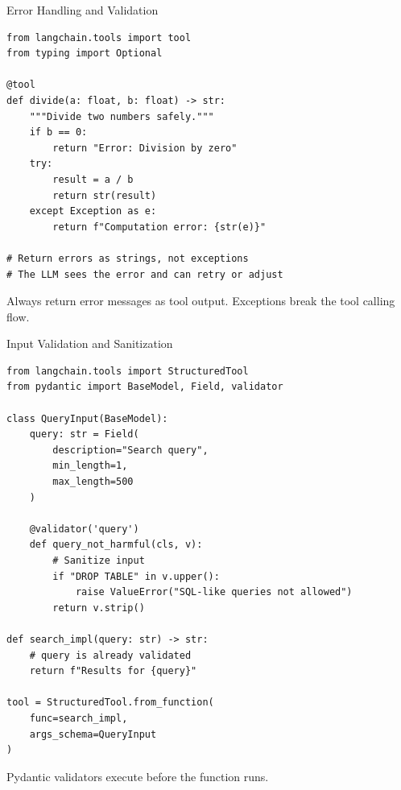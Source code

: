 \documentclass[aspectratio=169,11pt]{beamer}
\begin{document}
\begin{frame}[fragile]{Error Handling and Validation}
\begin{codebox}
\begin{lstlisting}
from langchain.tools import tool
from typing import Optional

@tool
def divide(a: float, b: float) -> str:
    """Divide two numbers safely."""
    if b == 0:
        return "Error: Division by zero"
    try:
        result = a / b
        return str(result)
    except Exception as e:
        return f"Computation error: {str(e)}"

# Return errors as strings, not exceptions
# The LLM sees the error and can retry or adjust
\end{lstlisting}
\end{codebox}

\begin{warningbox}
Always return error messages as tool output. Exceptions break the tool calling flow.
\end{warningbox}
\end{frame}

\begin{frame}[fragile,shrink=3]{Input Validation and Sanitization}
\begin{codebox}
\begin{lstlisting}
from langchain.tools import StructuredTool
from pydantic import BaseModel, Field, validator

class QueryInput(BaseModel):
    query: str = Field(
        description="Search query",
        min_length=1,
        max_length=500
    )

    @validator('query')
    def query_not_harmful(cls, v):
        # Sanitize input
        if "DROP TABLE" in v.upper():
            raise ValueError("SQL-like queries not allowed")
        return v.strip()

def search_impl(query: str) -> str:
    # query is already validated
    return f"Results for {query}"

tool = StructuredTool.from_function(
    func=search_impl,
    args_schema=QueryInput
)
\end{lstlisting}
\end{codebox}

Pydantic validators execute before the function runs.
\end{frame}
\end{document}
